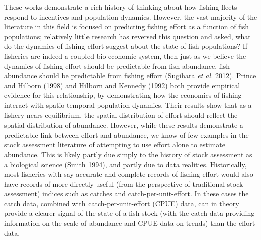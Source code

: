 \documentclass[twoside,12pt,final]{ucthesis-CA2012}
\begin{document}
\begin{ucmainmatter}
These works demonstrate a rich history of thinking about how fishing
fleets respond to incentives and population dynamics. However, the vast
majority of the literature in this field is focused on predicting
fishing effort as a function of fish populations; relatively little
research has reversed this question and asked, what do the dynamics of
fishing effort suggest about the state of fish populations? If fisheries
are indeed a coupled bio-economic system, then just as we believe the
dynamics of fishing effort should be predictable from fish abundance,
fish abundance should be predictable from fishing effort (Sugihara
\emph{et al.} \protect\hyperlink{ref-Sugihara2012}{2012}). Prince and
Hilborn (\protect\hyperlink{ref-Prince1998}{1998}) and Hilborn and
Kennedy (\protect\hyperlink{ref-Hilborn1992a}{1992}) both provide
empirical evidence for this relationship, by demonstrating how the
economics of fishing interact with spatio-temporal population dynamics.
Their results show that as a fishery nears equilibrium, the spatial
distribution of effort should reflect the spatial distribution of
abundance. However, while these results demonstrate a predictable link
between effort and abundance, we know of few examples in the stock
assessment literature of attempting to use effort alone to estimate
abundance. This is likely partly due simply to the history of stock
assessment as a biological science (Smith
\protect\hyperlink{ref-Smith1994}{1994}), and partly due to data
realities. Historically, most fisheries with say accurate and complete
records of fishing effort would also have records of more directly
useful (from the perspective of traditional stock assessment) indices
such as catches and catch-per-unit-effort. In these cases the catch
data, combined with catch-per-unit-effort (CPUE) data, can in theory
provide a clearer signal of the state of a fish stock (with the catch
data providing information on the scale of abundance and CPUE data on
trends) than the effort data.


\end{ucmainmatter}
\end{document}
